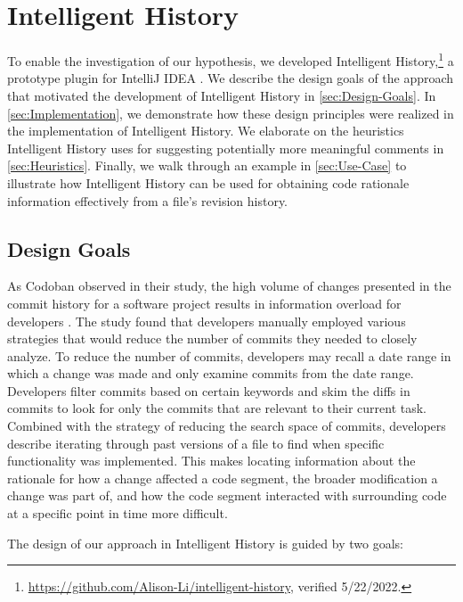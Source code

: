 \chapter{Intelligent History}
\label{ch:Intelligent-History}

To enable the investigation of our hypothesis, we developed Intelligent History,\footnote{\url{https://github.com/Alison-Li/intelligent-history}, verified 5/22/2022.} a prototype plugin for IntelliJ IDEA .
We describe the design goals of the approach that motivated the development of Intelligent History in \autoref{sec:Design-Goals}. 
In \autoref{sec:Implementation}, we demonstrate how these design principles were realized in the implementation of Intelligent History. 
We elaborate on the heuristics Intelligent History uses
for suggesting potentially more meaningful comments in \autoref{sec:Heuristics}.
Finally, we walk through an example in \autoref{sec:Use-Case} to illustrate how Intelligent History can be used for obtaining code rationale information effectively from a file's revision history.

\section{Design Goals}
\label{sec:Design-Goals}

As Codoban \etal observed in their study, the high volume of changes presented in the commit history for a software project results in information overload for developers \cite{codoban_software_2015}.
The study found that developers manually employed various strategies that would reduce the number of commits they needed to closely analyze.
To reduce the number of commits, developers may recall a date range in which a change was made and only examine commits from the date range.
Developers filter commits based on certain keywords and skim the diffs in commits to look for only the commits that are relevant to their current task.
Combined with the strategy of reducing the search space of commits, developers describe iterating through past versions of a file to find when specific functionality was implemented.
This makes locating information about the rationale for how a change affected a code segment, the broader modification a change was part of, and how the code segment interacted with surrounding code at a specific point in time more difficult.

The design of our approach in Intelligent History is guided by two goals: 

